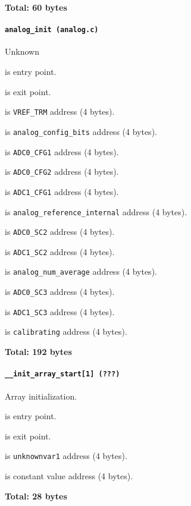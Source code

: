 \textbf{Total: 60 bytes}

\paragraph{\texttt{analog\_init (analog.c)}} Unknown

 is entry point.

 is exit point.

 is \texttt{VREF\_TRM} address (4 bytes).

 is \texttt{analog\_config\_bits} address (4 bytes).

 is \texttt{ADC0\_CFG1} address (4 bytes).

 is \texttt{ADC0\_CFG2} address (4 bytes).

 is \texttt{ADC1\_CFG1} address (4 bytes).

 is \texttt{analog\_reference\_internal} address
(4 bytes).

 is \texttt{ADC0\_SC2} address (4 bytes).

 is \texttt{ADC1\_SC2} address (4 bytes).

 is \texttt{analog\_num\_average} address (4 bytes).

 is \texttt{ADC0\_SC3} address (4 bytes).

 is \texttt{ADC1\_SC3} address (4 bytes).

 is \texttt{calibrating} address (4 bytes).

\textbf{Total: 192 bytes}

\paragraph{\texttt{\_\_init\_array\_start[1] (???)}} Array initialization.

 is entry point.

 is exit point.

 is \texttt{unknownvar1} address (4 bytes).

 is constant value address (4 bytes).

\textbf{Total: 28 bytes}

